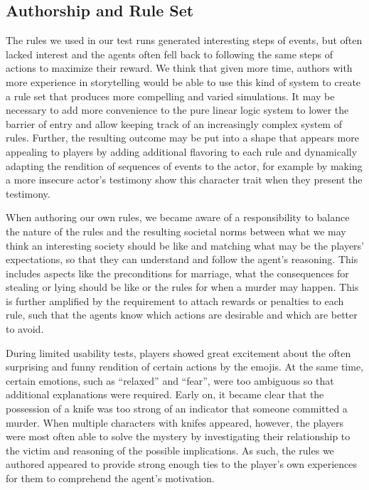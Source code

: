 \subsection{Authorship and Rule Set}
The rules we used in our test runs generated interesting steps of events, but often lacked interest and the agents often fell back to following the same steps of actions to maximize their reward.
We think that given more time, authors with more experience in storytelling would be able to use this kind of system to create a rule set that produces more compelling and varied simulations.
It may be necessary to add more convenience to the pure linear logic system to lower the barrier of entry and allow keeping track of an increasingly complex system of rules.
Further, the resulting outcome may be put into a shape that appears more appealing to players by adding additional flavoring to each rule and dynamically adapting the rendition of sequences of events to the actor, for example by making a more insecure actor's testimony show this character trait when they present the testimony.

When authoring our own rules, we became aware of a responsibility to balance the nature of the rules and the resulting societal norms between what we may think an interesting society should be like and matching what may be the players' expectations, so that they can understand and follow the agent's reasoning.
This includes aspects like the preconditions for marriage, what the consequences for stealing or lying should be like or the rules for when a murder may happen.
This is further amplified by the requirement to attach rewards or penalties to each rule, such that the agents know which actions are desirable and which are better to avoid.

During limited usability tests, players showed great excitement about the often surprising and funny rendition of certain actions by the emojis.
At the same time, certain emotions, such as \enquote{relaxed} and \enquote{fear}, were too ambiguous so that additional explanations were required.
Early on, it became clear that the possession of a knife was too strong of an indicator that someone committed a murder.
When multiple characters with knifes appeared, however, the players were most often able to solve the mystery by investigating their relationship to the victim and reasoning of the possible implications.
As such, the rules we authored appeared to provide strong enough ties to the player's own experiences for them to comprehend the agent's motivation.